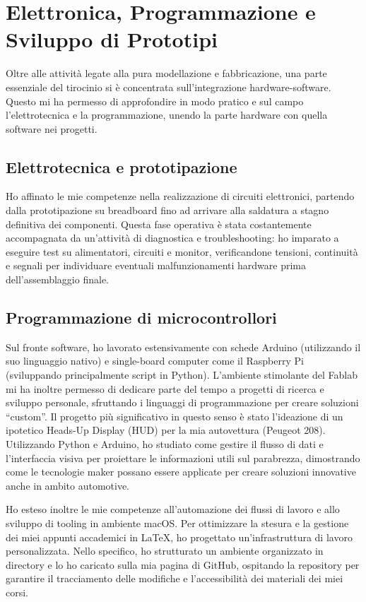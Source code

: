 \section{Elettronica, Programmazione e Sviluppo di Prototipi}
%
Oltre alle attività legate alla pura modellazione e fabbricazione, una parte essenziale del tirocinio si è concentrata sull'integrazione hardware-software. Questo mi ha permesso di approfondire in modo pratico e sul campo l'elettrotecnica e la programmazione, unendo la parte hardware con quella software nei progetti.

%
\subsection{Elettrotecnica e prototipazione}
Ho affinato le mie competenze nella realizzazione di circuiti elettronici, partendo dalla prototipazione su breadboard fino ad arrivare alla saldatura a stagno definitiva dei componenti. Questa fase operativa è stata costantemente accompagnata da un'attività di diagnostica e troubleshooting: ho imparato a eseguire test su alimentatori, circuiti e monitor, verificandone tensioni, continuità e segnali per individuare eventuali malfunzionamenti hardware prima dell'assemblaggio finale.
%
\subsection{Programmazione di microcontrollori}
Sul fronte software, ho lavorato estensivamente con schede Arduino (utilizzando il suo linguaggio nativo) e single-board computer come il Raspberry Pi (sviluppando principalmente script in Python).
L'ambiente stimolante del Fablab mi ha inoltre permesso di dedicare parte del tempo a progetti di ricerca e sviluppo personale, sfruttando i linguaggi di programmazione per creare soluzioni ``custom''. Il progetto più significativo in questo senso è stato l'ideazione di un ipotetico Heads-Up Display (HUD) per la mia autovettura (Peugeot 208). Utilizzando Python e Arduino, ho studiato come gestire il flusso di dati e l'interfaccia visiva per proiettare le informazioni utili sul parabrezza, dimostrando come le tecnologie maker possano essere applicate per creare soluzioni innovative anche in ambito automotive.

Ho esteso inoltre le mie competenze all'automazione dei flussi di lavoro e allo sviluppo di tooling in ambiente macOS. Per ottimizzare la stesura e la gestione dei miei appunti accademici in \LaTeX, ho progettato un'infrastruttura di lavoro personalizzata.
Nello specifico, ho strutturato un ambiente organizzato in directory e lo ho caricato sulla mia pagina di GitHub, ospitando la repository per garantire il tracciamento delle modifiche e l'accessibilità dei materiali dei miei corsi.

